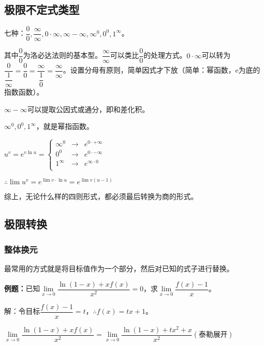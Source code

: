 \subsection{极限不定式类型}

七种：$\dfrac{0}{0},\dfrac{\infty}{\infty},0\cdot\infty,\infty-\infty,\infty^0,0^0,1^\infty$。

\medskip

其中$\dfrac{0}{0}$为洛必达法则的基本型。$\dfrac{\infty}{\infty}$可以类比$\dfrac{0}{0}$的处理方式。$0\cdot\infty$可以转为$\dfrac{0}{\dfrac{1}{\infty}}=\dfrac{0}{0}=\dfrac{\infty}{\dfrac{1}{0}}=\dfrac{\infty}{\infty}$。设置分母有原则，简单因式才下放（简单：幂函数，e为底的指数函数）。 

$\infty-\infty$可以提取公因式或通分，即和差化积。

\medskip

$\infty^0,0^0,1^\infty$，就是幂指函数。

\medskip

$
u^v=e^{v\ln u}=\left\{
\begin{array}{lcl}
    \infty^0 & \rightarrow & e^{0\cdot+\infty} \\
    0^0 & \rightarrow & e^{0\cdot-\infty} \\
    1^\infty & \rightarrow & e^{\infty\cdot 0} \\
\end{array} \right.
$

\medskip

$\therefore \lim u^v=e^{\lim v\cdot\ln u}=e^{\lim v(u-1)}$

综上，无论什么样的四则形式，都必须最后转换为商的形式。

\subsection{极限转换}

\subsubsection{整体换元}

最常用的方式就是将目标值作为一个部分，然后对已知的式子进行替换。

\textbf{例题：}已知$\lim\limits_{x\to 0}\dfrac{\ln(1-x)+xf(x)}{x^2}=0$，求$\lim\limits_{x\to 0}\dfrac{f(x)-1}{x}$。\medskip

解：令目标$\dfrac{f(x)-1}{x}=t$，$\therefore f(x)=tx+1$。\medskip

$\lim\limits_{x\to 0}\dfrac{\ln(1-x)+xf(x)}{x^2}=\lim\limits_{x\to 0}\dfrac{\ln(1-x)+tx^2+x}{x^2} (\text{泰勒展开})$\medskip

